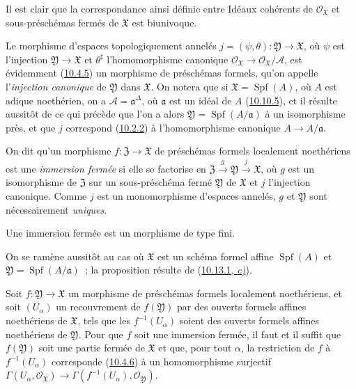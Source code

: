 Il est clair que la correspondance ainsi définie entre
Idéaux cohérents de $\mathscr{O}_{\mathfrak{X}}$ et sous-préschémas fermés de
$\mathfrak{X}$ est biunivoque.

Le morphisme d'espaces topologiquement annelés
$j=(\psi,\theta):\mathfrak{Y}\to\mathfrak{X}$, où $\psi$ est l'injection
$\mathfrak{Y}\to\mathfrak{X}$ et $\theta^\sharp$ l'homomorphisme canonique
$\mathscr{O}_{\mathfrak{X}}\to\mathscr{O}_{\mathfrak{X}}/\mathscr{A}$, est
évidemment (\hyperref[I.10.4.5-fr]{10.4.5}) un morphisme de préschémas formels,
qu'on appelle l'\emph{injection canonique} de $\mathfrak{Y}$ dans $\mathfrak{X}$.
On notera que si $\mathfrak{X}=\operatorname{Spf}(A)$, où $A$ est adique
noethérien, on a $\mathscr{A}=\mathfrak{a}^\Delta$, où $\mathfrak{a}$ est un
idéal de $A$ (\hyperref[I.10.10.5-fr]{10.10.5}), et il résulte aussitôt de ce
qui précède que l'on a alors
$\mathfrak{Y}=\operatorname{Spf}(A/\mathfrak{a})$ à un isomorphisme près, et que
$j$ correspond (\hyperref[I.10.2.2-fr]{10.2.2}) à l'homomorphisme canonique
$A\to A/\mathfrak{a}$.

On dit qu'un morphisme $f:\mathfrak{Z}\to\mathfrak{X}$ de préschémas formels
localement noethériens est une \emph{immersion fermée} si elle se factorise en
$\mathfrak{Z}\xrightarrow{g}\mathfrak{Y}\xrightarrow{j}\mathfrak{X}$, où $g$
est un isomorphisme de $\mathfrak{Z}$ sur un sous-préschéma fermé
$\mathfrak{Y}$ de $\mathfrak{X}$ et $j$ l'injection canonique. Comme $j$ est un
monomorphisme d'espaces annelés, $g$ et $\mathfrak{Y}$ sont nécessairement
\emph{uniques}.

\begin{proposition}[10.14.3]
\label{I.10.14.3-fr}
Une immersion fermée est un morphisme de type fini.
\end{proposition}

On se ramène aussitôt au cas où $\mathfrak{X}$ est un schéma formel affine
$\operatorname{Spf}(A)$ et $\mathfrak{Y}=\operatorname{Spf}(A/\mathfrak{a})$~;
la proposition résulte de (\hyperref[I.10.13.1-fr]{10.13.1, \emph{c)}}).

\begin{lemma}[10.14.4]
\label{I.10.14.4-fr}
Soit $f:\mathfrak{Y}\to\mathfrak{X}$ un morphisme de préschémas formels
localement noethériens, et soit $(U_\alpha)$ un recouvrement de
$f(\mathfrak{Y})$ par des ouverts formels affines noethériens de
$\mathfrak{X}$, tels que les $f^{-1}(U_\alpha)$ soient des ouverts formels
affines noethériens de $\mathfrak{Y}$. Pour que $f$ soit une immersion fermée,
il faut et il suffit que $f(\mathfrak{Y})$ soit une partie fermée de
$\mathfrak{X}$ et que, pour tout $\alpha$, la restriction de $f$ à
$f^{-1}(U_\alpha)$ corresponde \textup{(\hyperref[I.10.4.6-fr]{10.4.6})} à un
homomorphisme surjectif
$\Gamma(U_\alpha,\mathscr{O}_{\mathfrak{X}})\to
\Gamma(f^{-1}(U_\alpha),\mathscr{O}_{\mathfrak{Y}})$.
\end{lemma}

